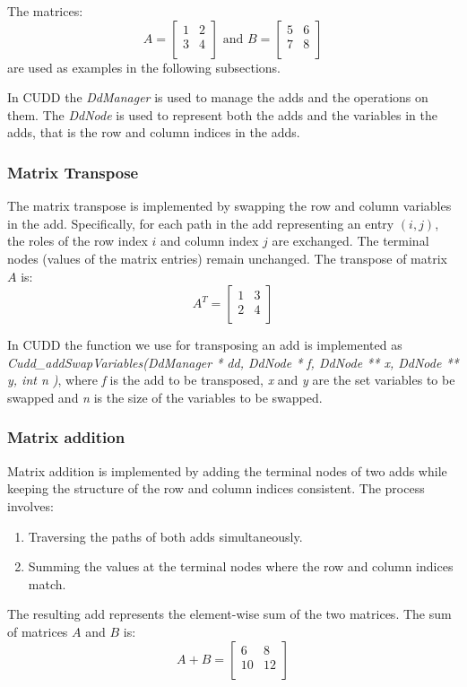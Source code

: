 The matrices:
\[
    A = \begin{bmatrix}
            1 & 2 \\
            3 & 4 \\
    \end{bmatrix}
\text{ and }
    B = \begin{bmatrix}
            5 & 6 \\
            7 & 8 \\
    \end{bmatrix}
\]
are used as examples in the following subsections.

In CUDD the \textit{DdManager} is used to manage the \glspl{add} and the operations on them.
The \textit{DdNode} is used to represent both the \glspl{add} and the variables in the \glspl{add}, that is the row and column indices in the \glspl{add}.

\subsubsection{Matrix Transpose}
The matrix transpose is implemented by swapping the row and column variables in the \gls{add}. Specifically, for each path in the \gls{add} representing an entry $(i, j)$, the roles of the row index 
$i$ and column index $j$ are exchanged. The terminal nodes (values of the matrix entries) remain unchanged.
The transpose of matrix $A$ is:
\[
    A^T = \begin{bmatrix}
              1 & 3 \\
              2 & 4 \\
    \end{bmatrix}
\]

In CUDD the function we use for transposing an \gls{add} is implemented as \textit{Cudd\_addSwapVariables(DdManager * dd, DdNode * f, DdNode ** x, DdNode ** y, int  n )}, where \textit{f} is the \gls{add} to be transposed, \textit{x} and \textit{y} are the set variables to be swapped and \textit{n} is the size of the variables to be swapped.

\subsubsection{Matrix addition}
Matrix addition is implemented by adding the terminal nodes of two \glspl{add} while keeping the structure of the row and column indices consistent. The process involves:
\begin{enumerate}
    \item Traversing the paths of both \glspl{add} simultaneously.
    \item Summing the values at the terminal nodes where the row and column indices match.
\end{enumerate}
The resulting \gls{add} represents the element-wise sum of the two matrices.
The sum of matrices $A$ and $B$ is:
\[
    A + B = \begin{bmatrix}
        6  & 8  \\
        10 & 12 \\
    \end{bmatrix}
\]

